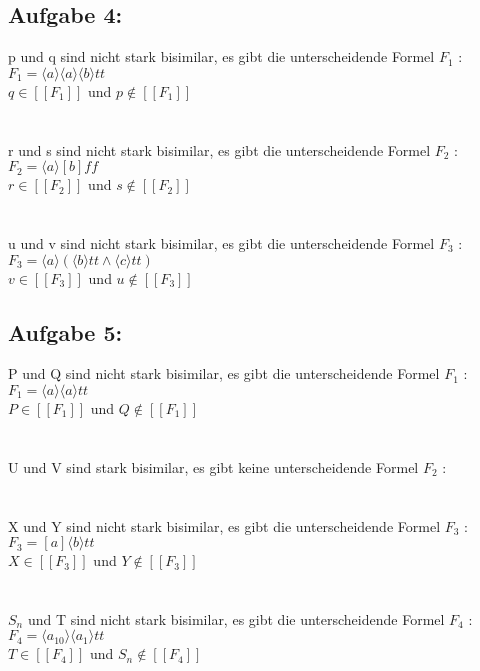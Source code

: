 \documentclass[10pt,a4paper,german,landscape,fleqn]{article} \usepackage[utf8]{inputenc} %
\newcommand{\auswf}[1]{[\![ #1 ]\!]}
\begin{document}
\subsection*{Aufgabe 4:}
p und q sind nicht stark bisimilar, es gibt die unterscheidende Formel $F_1$ : \\
$F_1 = \langle a \rangle \langle a \rangle \langle b \rangle tt $ \\
$q \in \auswf{F_1}$ und $p \notin \auswf{F_1}$\\
\\
\\
r und s sind nicht stark bisimilar, es gibt die unterscheidende Formel $F_2$ : \\
$F_2 = \langle a \rangle [b] ff $ \\
$r \in \auswf{F_2}$ und $s \notin \auswf{F_2}$\\
\\
\\
u und v sind nicht stark bisimilar, es gibt die unterscheidende Formel $F_3$ : \\
$F_3 = \langle a \rangle (\langle b \rangle tt \wedge \langle c \rangle tt ) $\\
$v \in \auswf{F_3}$ und $u \notin \auswf{F_3}$\\
\subsection*{Aufgabe 5:}
P und Q sind nicht stark bisimilar, es gibt die unterscheidende Formel $F_1$ : \\
$F_1 = \langle a \rangle \langle a \rangle tt$ \\
$ P\in \auswf{F_1}$ und $Q \notin \auswf{F_1}$\\
\\
\\
U und V sind stark bisimilar, es gibt keine unterscheidende Formel $F_2$ : \\
\\
\\
X und Y sind nicht stark bisimilar, es gibt die unterscheidende Formel $F_3$ : \\
$F_3 =  [a] \langle b \rangle tt$ \\
$X \in \auswf{F_3}$ und $Y \notin \auswf{F_3}$\\
\\
\\
$S_n$ und T sind nicht stark bisimilar, es gibt die unterscheidende Formel $F_4$ : \\
$F_4 = \langle a_{10} \rangle \langle a_1 \rangle tt $ \\
$T \in \auswf{F_4}$ und $S_n \notin \auswf{F_4}$\\
\\
\\
\end{document}
